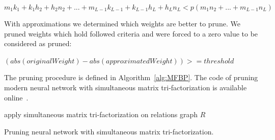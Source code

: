 \documentclass{article} %
\begin{document}
\begin{equation} \label{eq:2}
 m_1k_1 + k_1h_2 + h_2n_2 + ... + m_{L-1}k_{L-1} + k_{L-1}h_L + h_Ln_L < 
p(m_1n_2 + ... + m_{L-1}n_L)
\end{equation}



With approximations we determined which weights are better to prune. We pruned
weights which hold followed criteria and were forced to a zero value to be
considered as pruned:

$(abs(originalWeight) - abs(approximatedWeight)) >= threshold$



The pruning procedure is defined in Algorithm~\ref{alg:MFBP}.
The code of pruning modern neural network with simultaneous matrix 
tri-factorization is available online~\cite{code}.


\begin{algorithm}[H]
\label{alg:MFBP}
 apply simultaneous matrix tri-factorization on relations graph $R$\;
 \caption{Pruning neural network with simultaneous matrix tri-factorization.}
 
\end{algorithm}
	
\end{document}
